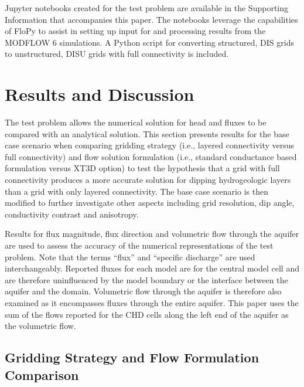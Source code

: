 \documentclass{article}
\begin{document}
Jupyter notebooks created for the test problem are available in the Supporting Information that accompanies this paper. The notebooks leverage the capabilities of FloPy \citep{bakker2016scripting, hughes2023flopy} to assist in setting up input for and processing results from the MODFLOW 6 simulations. A Python script for converting structured, DIS grids to unstructured, DISU grids with full connectivity is included.

\section{Results and Discussion}

The test problem allows the numerical solution for head and fluxes to be compared with an analytical solution. This section presents results for the base case scenario when comparing gridding strategy (i.e., layered connectivity versus full connectivity) and flow solution formulation (i.e., standard conductance based formulation versus XT3D option) to test the hypothesis that a grid with full connectivity produces a more accurate solution for dipping hydrogeologic layers than a grid with only layered connectivity. The base case scenario is then modified to further investigate other aspects including grid resolution, dip angle, conductivity contrast and anisotropy. 

Results for flux magnitude, flux direction and volumetric flow through the aquifer are used to assess the accuracy of the numerical representations of the test problem. Note that the terms ``flux''  and ``specific discharge'' are used interchangeably. Reported fluxes for each model are for the central model cell and are therefore uninfluenced by the model boundary or the interface between the aquifer and the domain. Volumetric flow through the aquifer is therefore also examined as it encompasses fluxes through the entire aquifer. This paper uses the sum of the flows reported for the CHD cells along the left end of the aquifer as the volumetric flow. 

\subsection{Gridding Strategy and Flow Formulation Comparison}
\end{document}
